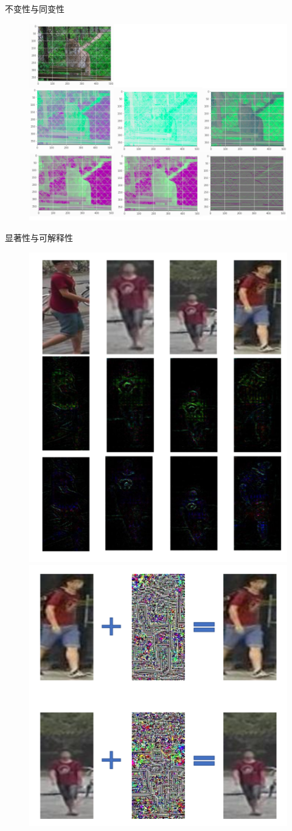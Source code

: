 \documentclass[notes]{beamer}
\begin{document}
\begin{frame}{不变性与同变性}
	\begin{figure}
		\centering 
		\includegraphics[width=.75\textwidth]{2018-05-21-10-51-51.png}
	\end{figure}
\end{frame}

\begin{frame}{显著性与可解释性}
	\begin{figure}
		\centering 
		\includegraphics[width=.47\textwidth]{2018-05-21-09-58-23.png} 
		\includegraphics[width=.47\textwidth]{2018-05-21-10-31-13.png}
	\end{figure}
\end{frame}
\end{document}
